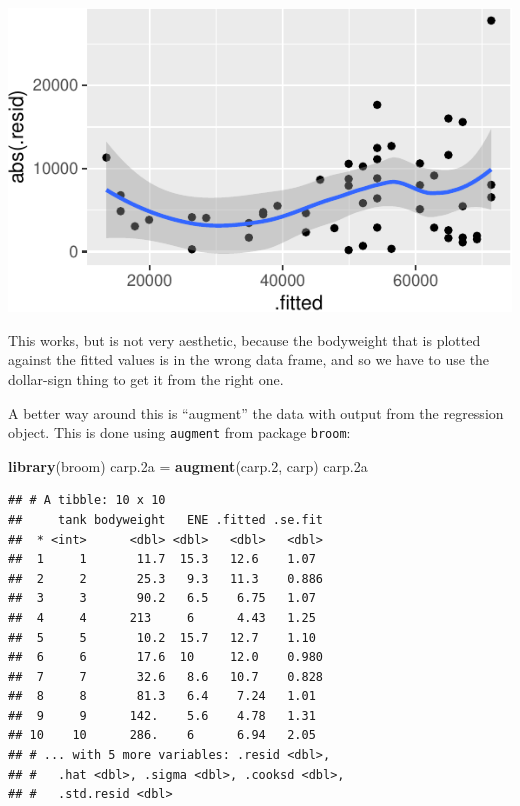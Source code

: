 \documentclass[]{tufte-book}
\newenvironment{Shaded}{}{}
\newcommand{\FloatTok}[1]{\textcolor[rgb]{0.25,0.63,0.44}{#1}}
\newcommand{\KeywordTok}[1]{\textcolor[rgb]{0.00,0.44,0.13}{\textbf{#1}}}
\newcommand{\NormalTok}[1]{#1}
\newcommand{\StringTok}[1]{\textcolor[rgb]{0.25,0.44,0.63}{#1}}
\theoremstyle{definition}
\theoremstyle{definition}
\theoremstyle{definition}
\theoremstyle{remark}
\begin{document}
\includegraphics{12-regression_files/figure-latex/unnamed-chunk-69-1}

This works, but is not very aesthetic, because the bodyweight that is
plotted against the fitted values is in the wrong data frame, and so we
have to use the dollar-sign thing to get it from the right one.

A better way around this is ``augment'' the data with output from the
regression object. This is done using \texttt{augment} from package
\texttt{broom}:

\begin{Shaded}
\begin{Highlighting}[]
\KeywordTok{library}\NormalTok{(broom)}
\NormalTok{carp}\FloatTok{.2}\NormalTok{a =}\StringTok{ }\KeywordTok{augment}\NormalTok{(carp}\FloatTok{.2}\NormalTok{, carp)}
\NormalTok{carp}\FloatTok{.2}\NormalTok{a}
\end{Highlighting}
\end{Shaded}

\begin{verbatim}
## # A tibble: 10 x 10
##     tank bodyweight   ENE .fitted .se.fit
##  * <int>      <dbl> <dbl>   <dbl>   <dbl>
##  1     1       11.7  15.3   12.6    1.07 
##  2     2       25.3   9.3   11.3    0.886
##  3     3       90.2   6.5    6.75   1.07 
##  4     4      213     6      4.43   1.25 
##  5     5       10.2  15.7   12.7    1.10 
##  6     6       17.6  10     12.0    0.980
##  7     7       32.6   8.6   10.7    0.828
##  8     8       81.3   6.4    7.24   1.01 
##  9     9      142.    5.6    4.78   1.31 
## 10    10      286.    6      6.94   2.05 
## # ... with 5 more variables: .resid <dbl>,
## #   .hat <dbl>, .sigma <dbl>, .cooksd <dbl>,
## #   .std.resid <dbl>
\end{verbatim}
\end{document}
